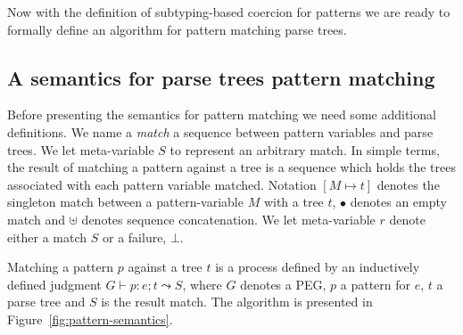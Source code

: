 Now with the definition of subtyping-based coercion for patterns we are
ready to formally define an algorithm for pattern matching parse trees.

\subsection{A semantics for parse trees pattern matching}

Before presenting the semantics for pattern matching we need some additional
definitions. We name a \emph{match} a sequence between pattern variables
and parse trees. We let meta-variable $S$ to represent an arbitrary match.
In simple terms, the result of matching a pattern against a tree is a sequence
which holds the trees associated with each pattern variable matched.
Notation $[M \mapsto t]$ denotes the singleton match between
a pattern-variable $M$ with a tree $t$, $\bullet$ denotes an empty match and
$\uplus$ denotes sequence concatenation. We let meta-variable $r$
denote either a match $S$ or a failure, $\bot$.

Matching a pattern $p$ against a tree $t$ is a process defined by an inductively
defined judgment $G \vdash p : e; t \leadsto S$, where $G$ denotes a PEG,
$p$ a pattern for $e$, $t$ a parse tree and $S$ is the result match.
The algorithm is presented in Figure~\ref{fig:pattern-semantics}.

